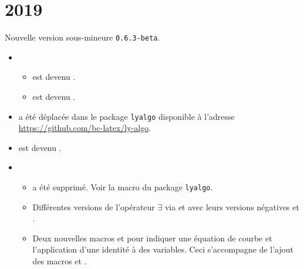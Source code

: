 \documentclass[12pt,a4paper]{book}
\begin{document}


\section{2019}

        \begin{description}
\medskip
\item[2019-10-21] Nouvelle version sous-mineure \verb+0.6.3-beta+.

\begin{itemize}[itemsep=.5em]
    \item {}
    \begin{itemize}[itemsep=.5em]
        \item {} est devenu .

        \item {} est devenu .
    \end{itemize}




    \item {}
           a été déplacée dans le package \verb+lyalgo+ disponible à l'adresse \url{https://github.com/bc-latex/ly-algo}.




    \item {}
           est devenu .




    \item {}
    \begin{itemize}[itemsep=.5em]
        \item {} a été supprimé. Voir la macro  du package \verb+lyalgo+.

        \item Différentes versions de l'opérateur $\exists$ via  et  avec leurs versions négatives  et .

        \item Deux nouvelles macros  et  pour indiquer une équation de courbe et l'application d'une identité à des variables. Ceci s'accompagne de l'ajout des macros  et .


\end{itemize}
\end{itemize}
\end{description}
\end{document}
